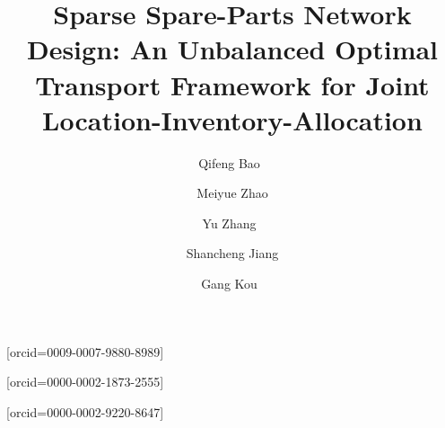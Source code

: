 \documentclass[a4paper,fleqn]{cas-sc}
\theoremstyle{remark}
\theoremstyle{plain}
\begin{document}
\let\WriteBookmarks\relax
\def\floatpagepagefraction{0.7}
\def\textpagefraction{.001}
\let\printorcid\relax %


\shortauthors{}


\title[mode = title]{Sparse Spare-Parts Network Design: An Unbalanced Optimal Transport Framework for Joint Location-Inventory-Allocation}  


\author[1]{Qifeng Bao~}[orcid=0009-0007-9880-8989]


\author[1]{Meiyue Zhao}


\author[1,2]{Yu Zhang~}[orcid=0000-0002-1873-2555]
\cormark[1]

\author[3]{Shancheng Jiang}

\author[1,4]{Gang Kou~}[orcid=0000-0002-9220-8647]


\address[1]{Department of Big Data Management, School of Business Administration, Southwestern University of Finance and Economics, Chengdu 611130, China}
\address[2]{Big Data Laboratory on Financial Security and Behavior, Southwestern University of Finance and Economics (Laboratory of Philosophy and Social Sciences, Ministry of Education), Chengdu 611130, China}
\address[3]{School of Intelligent Systems Engineering, Sun Yat-sen University, No. 66, Gongchang Road, Guangming District, Shenzhen, 518107, Guangdong, China}
\address[4]{Xiangjiang Laboratory, Changsha 410205, China}










\end{document}

